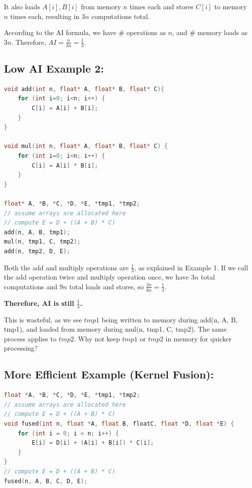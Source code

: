 \documentclass[twoside]{article}
\begin{document}
It also loads $A[i], B[i]$ from memory $n$ times each and stores $C[i]$ to memory $n$ times each, resulting in $3n$ computations total.

According to the AI formula, we have $\#$ operations as $n$, and $\#$ memory loads as $3n$. Therefore, $AI = \frac{n}{3n} = \frac{1}{3}$.


\subsection{Low AI Example 2:}
\begin{lstlisting}[language=C++, title={Simple add() and mul() kernel}]
void add(int n, float* A, float* B, float* C){
    for (int i=0; i<n; i++) {
        C[i] = A[i] + B[i];
    }
}

void mul(int n, float* A, float* B, float* C) {
    for (int i=0; i<n; i++) {
        C[i] = A[i] * B[i];
    }
}

float* A, *B, *C, *D, *E, *tmp1, *tmp2;
// assume arrays are allocated here
// compute E = D + ((A + B) * C)
add(n, A, B, tmp1);
mul(n, tmp1, C, tmp2);
add(n, tmp2, D, E);
\end{lstlisting}

Both the add and multiply operations are $\frac{1}{3}$, as explained in Example 1. If we call the add operation twice and multiply operation once, we have $3n$ total computations and $9n$ total loads and stores, so $\frac{2n}{6n} = \frac{1}{3}.$

\textbf{Therefore, AI is still $\frac{1}{3}$.} 

This is wasteful, as we see $tmp1$ being written to memory during add(n, A, B, tmp1), and loaded from memory during mul(n, tmp1, C, tmp2). The same process applies to $tmp2$. Why not keep $tmp1$ or $tmp2$ in memory for quicker processing?


\subsection{More Efficient Example (Kernel Fusion):}
\begin{lstlisting}[language=C++, title={Fused kernel}]
float *A, *B, *C, *D, *E, *tmp1, *tmp2;
// assume arrays are allocated here
// compute E = D + ((A + B) * C)
void fused(int n, float *A, float B, floatC, float *D, float *E) {
    for (int i = 0; i < n; i++) {
        E[i] = D[i] + (A[i] + B[i]) * C[i];
    }
}
// compute E = D + ((A + B) * C)
fused(n, A, B, C, D, E);
\end{lstlisting}
\end{document}
